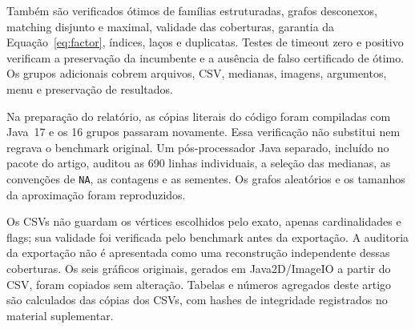 Também são verificados ótimos de famílias estruturadas, grafos
desconexos, matching disjunto e maximal, validade das coberturas,
garantia da Equação~\eqref{eq:factor}, índices, laços e duplicatas.
Testes de timeout zero e positivo verificam a preservação da
incumbente e a ausência de falso certificado de ótimo.
Os grupos adicionais cobrem arquivos, CSV, medianas, imagens,
argumentos, menu e preservação de resultados.

Na preparação do relatório, as cópias literais do código foram
compiladas com Java~17 e os 16 grupos passaram novamente. Essa
verificação não substitui nem regrava o benchmark original.
Um pós-processador Java separado, incluído no pacote do artigo,
auditou as 690 linhas individuais, a seleção das medianas, as
convenções de \texttt{NA}, as contagens e as sementes. Os grafos
aleatórios e os tamanhos da aproximação foram reproduzidos.

Os CSVs não guardam os vértices escolhidos pelo exato, apenas
cardinalidades e flags; sua validade foi verificada pelo benchmark
antes da exportação. A auditoria da exportação não é apresentada
como uma reconstrução independente dessas coberturas. Os seis
gráficos originais, gerados em Java2D/ImageIO a partir do CSV,
foram copiados sem alteração. Tabelas e números agregados deste
artigo são calculados das cópias dos CSVs, com hashes de integridade
registrados no material suplementar.
